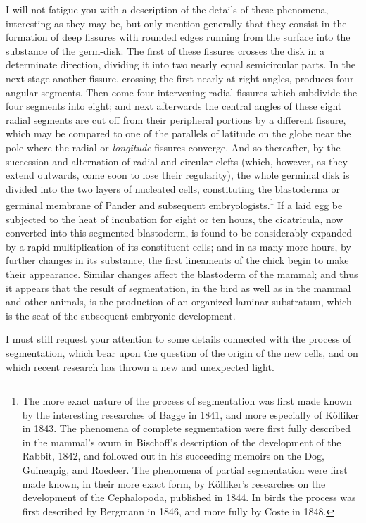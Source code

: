 \documentclass[a4paper, 11pt, oneside, english]{article}
\begin{document}
I will not fatigue you with a description of the details of these phenomena, interesting as they may be, but only mention generally that they consist in the formation of deep fissures with rounded edges running from the surface into the substance of the germ-disk. The first of these fissures crosses the disk in a determinate direction, dividing it into two nearly equal semicircular parts. In the next stage another fissure, crossing the first nearly at right angles, produces four angular segments. Then come four intervening radial fissures which subdivide the four segments into eight; and next afterwards the central angles of these eight radial segments are cut off from their peripheral portions by a different fissure, which may be compared to one of the parallels of latitude on the globe near the pole where the radial or \emph{longitude} fissures converge. And so thereafter, by the succession and alternation of radial and circular clefts (which, however, as they extend outwards, come soon to lose their regularity), the whole germinal disk is divided into the two layers of nucleated cells, constituting the blastoderma or germinal membrane of Pander and subsequent embryologists.\footnote{The more exact nature of the process of segmentation was first made known by the interesting researches of Bagge in 1841, and more especially of Kölliker in 1843. The phenomena of complete segmentation were first fully described in the mammal's ovum in Bischoff's description of the development of the Rabbit, 1842, and followed out in his succeeding memoirs on the Dog, Guineapig, and Roedeer. The phenomena of partial segmentation were first made known, in their more exact form, by Kölliker's researches on the development of the Cephalopoda, published in 1844. In birds the process was first described by Bergmann in 1846, and more fully by Coste in 1848.} If a laid egg be subjected to the heat of incubation for eight or ten hours, the cicatricula, now converted into this segmented blastoderm, is found to be considerably expanded by a rapid multiplication of its constituent cells; and in as many more hours, by further changes in its substance, the first lineaments of the chick begin to make their appearance. Similar changes affect the blastoderm of the mammal; and thus it appears that the result of segmentation, in the bird as well as in the mammal and other animals, is the production of an organized laminar substratum, which is the seat of the subsequent embryonic development.

I must still request your attention to some details connected with the process of segmentation, which bear upon the question of the origin of the new cells, and on which recent research has thrown a new and unexpected light.
\end{document}
